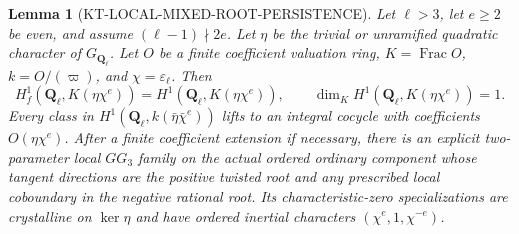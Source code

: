 \documentclass[11pt,a4paper]{article}
\newtheorem{lemma}[theorem]{Lemma}
\theoremstyle{definition}
\begin{document}
\begin{lemma}[KT-LOCAL-MIXED-ROOT-PERSISTENCE]
Let $\ell>3$, let $e\ge2$ be even, and assume
$(\ell-1)\nmid2e$.  Let $\eta$ be the trivial or
unramified quadratic character of $G_{\mathbf Q_\ell}$.
Let $O$ be a finite coefficient valuation ring,
$K=\operatorname{Frac}O$, $k=O/(\varpi)$, and
$\chi=\varepsilon_\ell$.  Then
\[
 H^1_f(\mathbf Q_\ell,K(\eta\chi^e))
     =H^1(\mathbf Q_\ell,K(\eta\chi^e)),\qquad
 \dim_K H^1(\mathbf Q_\ell,K(\eta\chi^e))=1.             \tag{LM.1}
\]
Every class in $H^1(\mathbf Q_\ell,k(\bar\eta\bar\chi^e))$
lifts to an integral cocycle with coefficients
$O(\eta\chi^e)$.  After a finite coefficient extension
if necessary, there is an explicit two-parameter
local $GG_3$ family on the actual ordered ordinary
component whose tangent directions are the positive
twisted root and any prescribed local coboundary
in the negative rational root.  Its characteristic-zero
specializations are crystalline on $\ker\eta$ and have
ordered inertial characters $(\chi^e,1,\chi^{-e})$.
\end{lemma}
\end{document}
